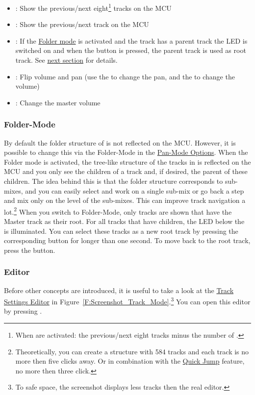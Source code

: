 \begin{itemize}
\item \bankdu: Show the previous/next eight\footnote{When
\anchors are activated: the previous/next eight tracks minus the
number of \anchors.} tracks on the MCU

\item \channeldu: Show the previous/next track on the MCU

\item \gv: If the \hyperref[foldermode]{Folder mode} is activated and the
track has a parent track the LED is switched on and when the button is pressed,
the parent track is used as root track. See \hyperref[foldermode]{next
section} for details.

\item \flip: Flip volume and pan (use the \faders to change the pan, and the
\vpots to change the volume)

\item \mfader: Change the master volume
\end{itemize}

\noindent

\subsubsection{Folder-Mode}\label{foldermode}
By default the folder structure of \reaper is not reflected on the
MCU. However, it is possible to change this via the Folder-Mode
\attribute in the \hyperref[T:multitrack_options1]{Pan-Mode
  Options}. When the Folder mode is activated, the tree-like structure
of the tracks in \reaper is reflected on the MCU and you only see the
children of a track and, if desired, the parent of these children. The
idea behind this is that the folder structure corresponds to
sub-mixes, and you can easily select and work on a single sub-mix or
go back a step and mix only on the level of the sub-mixes. This can
improve track navigation a lot.\footnote{Theoretically, you can create a
  structure with 584 tracks and each track is no more then five clicks
  away. Or in combination with the \hyperref[quickjump]{Quick Jump}
  feature, no more then three click.} When you switch to Folder-Mode, only
tracks are shown that have the Master track as their root. For all
tracks that have children, the LED below the \vpot is illuminated. You can
select these tracks as a new root track by pressing the
corresponding \select button for longer than one second. To move back to
the root track, press the \gv button.

\subsubsection{Editor}\label{panmodeeditor}
Before other concepts are introduced, it is useful to take a look at the
\hyperref[F:Screenshot_Track_Mode]{Track Settings Editor} in
Figure~\ref{F:Screenshot_Track_Mode}.\footnote{To safe space, the screenshot
displays less tracks then the real editor.} You can open this editor by pressing
\alt \pan. 

